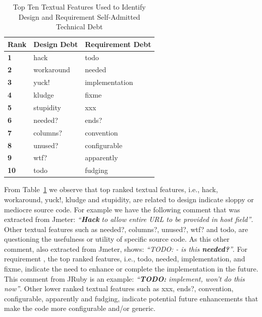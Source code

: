 \begin{table}[!thb]
    \begin{center}
        \caption{Top Ten Textual Features Used to Identify Design and Requirement Self-Admitted Technical Debt}
        \label{tbl:top_ten_features}
        \begin{tabular}{l| l l }
        \toprule
        \textbf{Rank} & \textbf{Design Debt} & \textbf{Requirement Debt}  \\
        \midrule
         \textbf{1}  & hack       &   todo              \\
         \textbf{2}  & workaround &   needed            \\
         \textbf{3}  & yuck!      &   implementation    \\
         \textbf{4}  & kludge     &   fixme             \\
         \textbf{5}  & stupidity  &   xxx               \\
         \textbf{6}  & needed?    &   ends?             \\
         \textbf{7}  & columns?   &   convention        \\
         \textbf{8}  & unused?    &   configurable      \\
         \textbf{9}  & wtf?       &   apparently        \\
         \textbf{10} & todo       &   fudging           \\
        \bottomrule
        \end{tabular}
    \end{center}    
\end{table}

From Table~\ref{tbl:top_ten_features} we observe that top ranked textual features, i.e., hack, workaround, yuck!, kludge and stupidity, are related to design \SATD indicate sloppy or mediocre source code. For example we have the following comment that was extracted from Jmeter: \textit{``\textbf{Hack} to allow entire URL to be provided in host field''}. Other textual features such as needed?, columns?, unused?, wtf? and todo, are questioning the usefulness or utility of specific source code. As this other comment, also extracted from Jmeter, shows: \textit{``TODO: - is this \textbf{needed?}''}. For requirement \SATD, the top ranked features, i.e., todo, needed, implementation, and fixme, indicate the need to enhance or complete the implementation in the future. This comment from JRuby is an example: \textit{``\textbf{TODO:} implement, won't do this now''}. Other lower ranked textual features such as xxx, ends?, convention, configurable, apparently and fudging, indicate potential future enhancements that make the code more configurable and/or generic.

